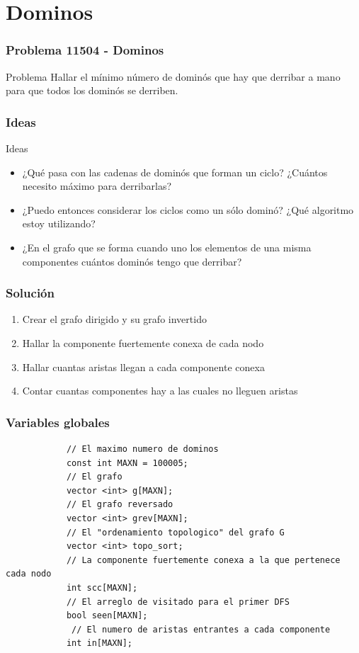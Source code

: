 \documentclass{beamer}
\begin{document}
\section{Dominos}
	\begin{frame}
		\frametitle{Problema 11504 - Dominos}
		\begin{block}{Problema}
			Hallar el mínimo número de dominós que hay que derribar a mano para que todos los dominós se derriben.
		\end{block}
	\end{frame}
	
	\begin{frame}
		\frametitle{Ideas}
		\begin{alertblock}{Ideas}
			\begin{itemize}
				\item ¿Qué pasa con las cadenas de dominós que forman un ciclo? ¿Cuántos necesito máximo para derribarlas? \pause
				\item ¿Puedo entonces considerar los ciclos como un sólo dominó? ¿Qué algoritmo estoy utilizando? \pause
				\item ¿En el grafo que se forma cuando uno los elementos de una misma componentes cuántos dominós tengo que derribar?
			\end{itemize}
		\end{alertblock}
	\end{frame}
	
	\begin{frame}
		\frametitle{Solución}
		\begin{enumerate}
			\item Crear el grafo dirigido y su grafo invertido
			\item Hallar la componente fuertemente conexa de cada nodo
			\item Hallar cuantas aristas llegan a cada componente conexa
			\item Contar cuantas componentes hay a las cuales no lleguen aristas
		\end{enumerate}
	\end{frame}
	
	\begin{frame}[fragile]
		\frametitle{Variables globales}
		\begin{lstlisting}
			// El maximo numero de dominos
			const int MAXN = 100005; 
			// El grafo
			vector <int> g[MAXN];
			// El grafo reversado    
			vector <int> grev[MAXN];
			// El "ordenamiento topologico" del grafo G 
			vector <int> topo_sort;  
			// La componente fuertemente conexa a la que pertenece cada nodo
			int scc[MAXN];  
			// El arreglo de visitado para el primer DFS         
			bool seen[MAXN];
			 // El numero de aristas entrantes a cada componente         
			int in[MAXN];           
		\end{lstlisting}
	\end{frame}
	
\end{document}
